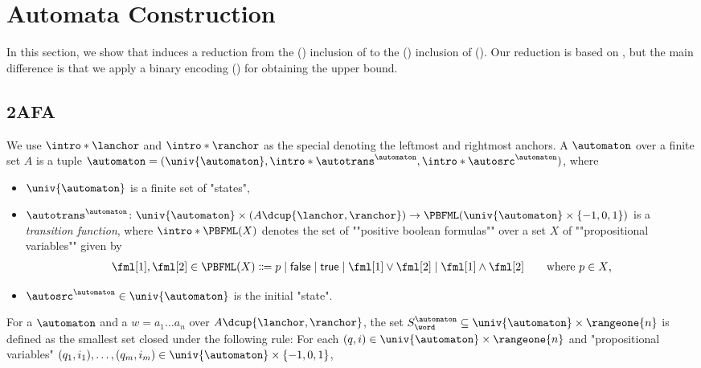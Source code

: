\documentclass[10pt,a4paper]{article}
\theoremstyle{definition}
\theoremstyle{remark}
\DeclarePairedDelimiter\set{\{}{\}}
\DeclarePairedDelimiter\tuple{(}{)}
\newcommand{\const}[1]{\mathsf{#1}}
\begin{document}
\section{Automata Construction} \label{section: automata construction}
In this section, 
we show that 
induces a reduction
from the () inclusion of 
to the () inclusion of  ().
Our reduction is based on \cite[\S 5.3]{nakamuraDerivativesGraphsPositive2025},
but the main difference is that we apply a binary encoding () for obtaining the  upper bound.

%
%

\subsection{2AFA}
\AP
We use $\intro*\lanchor$ and $\intro*\ranchor$ as the special  denoting the leftmost and rightmost anchors.
%
A \intro*{} $\automaton$ over a finite set $A$ is a tuple $\automaton = \tuple{\univ{\automaton}, \intro*\autotrans^{\automaton}, \intro*\autosrc^{\automaton}}$, where 
\begin{itemize}
    \item $\univ{\automaton}$ is a finite set of "states",
    \item \AP $\autotrans^{\automaton} \colon \univ{\automaton} \times (A \dcup \set{\lanchor, \ranchor}) \to \PBFML(\univ{\automaton} \times \set{-1, 0, 1})$ is a \emph{transition function},
    where $\intro*\PBFML(X)$ denotes the set of ""positive boolean formulas"" over a set $X$ of ""propositional variables"" given by
    \begin{align*}
        \fml[1], \fml[2] \in \PBFML(X) \Coloneqq p \mid \const{false} \mid \const{true} \mid \fml[1] \lor \fml[2] \mid \fml[1] \land \fml[2] \tag*{where $p \in X$,}
    \end{align*}
\item $\autosrc^{\automaton} \in \univ{\automaton}$ is the initial "state".
\end{itemize}
For a  $\automaton$ and a  $w = a_{1} \dots a_{n}$ over $A \dcup \set{\lanchor, \ranchor}$,
the set $S^{\automaton}_{\word} \subseteq \univ{\automaton} \times \rangeone{n}$ is defined as
the smallest set closed under the following rule:
    For each $\tuple{q, i} \in \univ{\automaton} \times \rangeone{n}$
    and "propositional variables" $\tuple{q_1, i_1}, \dots, \tuple{q_{m}, i_{m}} \in \univ{\automaton} \times \set{-1, 0, 1}$,
\end{document}
